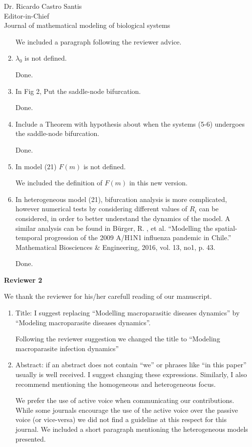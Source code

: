 \documentclass [12pt]{letter}
\begin{document}
\begin{letter}{Dr. Ricardo Castro Santis\\ Editor-in-Chief \\ Journal of mathematical modeling of biological systems}
\begin{enumerate}
		We included a paragraph following the reviewer advice.
		
		\item $\lambda_0$ is not defined.
		
		Done.
		
		\item In Fig 2, Put the saddle-node bifurcation.
		
		Done.	
		
		\item Include a Theorem with hypothesis about when the systems (5-6) undergoes the
		saddle-node bifurcation.
		
		Done.
		
		\item In model (21) $F (m)$ is not defined.
		
		We included the definition of $F(m)$ in this new version.
		
		\item In heterogeneous model (21), bifurcation analysis is more complicated, however
		numerical tests by considering different values of $R_i$ can be considered, in order to
		better understand the dynamics of the model. A similar analysis can be found in
		B\"urger, R. , et al. ``Modelling the spatial-temporal progression of the 2009 A/H1N1 influenza pandemic in Chile.” Mathematical Biosciences \& Engineering, 2016, vol.	13, no1, p. 43.
		
		Done.
\end{enumerate}

\newpage	

\textbf{Reviewer 2}
	
We thank the reviewer for his/her carefull reading of our manuscript.	

\begin{enumerate}
	\item Title: I suggest replacing “Modelling macroparasitic diseases dynamics” by
	“Modeling macroparasite diseases dynamics”.
	
	Following the reviewer suggestion we changed the title to ``Modeling macroparasite infection dynamics''
	
	\item Abstract: if an abstract does not contain “we” or phrases like “in this paper”
	usually is well received. I suggest changing these expressions. Similarly, I also
	recommend mentioning the homogeneous and heterogeneous focus.
	
	We prefer the use of active voice when communicating our contributions. While some journals encourage the use of the active voice over the passive voice (or vice-versa) we did not find a guideline at this respect for this journal. We included a short paragraph mentioning the heterogeneous models presented.
	

\end{enumerate}
\end{letter}
\end{document}
